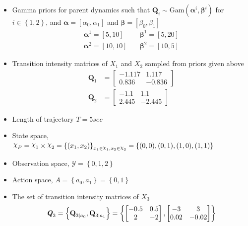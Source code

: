 \begin{itemize}
	\item Gamma priors for parent dynamics such that $ \textbf{Q}_{i} \sim \mathrm{Gam}(\symbf{\alpha}^i, \symbf{\beta}^i)$ for $i \in \left\lbrace 1,2\right\rbrace $, and $ \symbf{\alpha} = [\alpha_0, \alpha_1] $ and $ \symbf{\beta} = [\beta_0, \beta_1] $
	\begin{align}
	\symbf{\alpha}^1 = [5,10] &\quad \symbf{\beta}^1 = [5,20] \\
	\symbf{\alpha}^2 = [10,10] &\quad \symbf{\beta}^2 = [10,5]
	\label{eq:gamma_params}
	\end{align}
	\item Transition intensity matrices of $ X_1 $ and $ X_2 $ sampled from priors given above
	\begin{align}
	\textbf{Q}_1 &= 
	\begin{bmatrix}
	-1.117 & 1.117 \\
	0.836 &  -0.836
	\end{bmatrix} \\
	\textbf{Q}_2 &= 
	\begin{bmatrix}
	-1.1 & 1.1 \\
	2.445 &  -2.445
	\end{bmatrix}
	\end{align}
	\item Length of trajectory $ T = 5sec $
	\item State space, $ \rchi_{P} = \rchi_1 \times \rchi_2 = \left\lbrace (x_1, x_2)\right\rbrace_{x_1\in \rchi_1, x_2\in \rchi_2} = \left\lbrace (0, 0), (0, 1), (1, 0),(1, 1)\right\rbrace $
	\item Observation space, $ \mathcal{Y} = \left\lbrace 0, 1, 2 \right\rbrace $
	\item Action space, $ \textit{A} = \left\lbrace a_{0}, a_{1} \right\rbrace = \left\lbrace 0, 1\right\rbrace $
	\item The set of transition intensity matrices of $ X_3 $
	\begin{align}
	\textbf{\textit{Q}}_3 = \left\lbrace \textbf{Q}_{3\mid a_{0}}, \textbf{Q}_{3\mid a_{1}} \right\rbrace = \left\lbrace 
	\begin{bmatrix}
	-0.5 & 0.5 \\
	2 &  -2
	\end{bmatrix}, 
	\begin{bmatrix}
	-3 & 3 \\
	0.02 &  -0.02
	\end{bmatrix} 
	\right\rbrace 
	\end{align}

\end{itemize}

